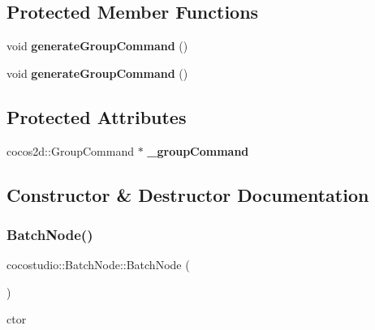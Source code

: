\subsection*{Protected Member Functions}
\begin{DoxyCompactItemize}
\item 
\mbox{\label{classcocostudio_1_1BatchNode_ae972bbb194f311b264b03f06f98d785c}} 
void {\bfseries generate\+Group\+Command} ()
\item 
\mbox{\label{classcocostudio_1_1BatchNode_ae972bbb194f311b264b03f06f98d785c}} 
void {\bfseries generate\+Group\+Command} ()
\end{DoxyCompactItemize}
\subsection*{Protected Attributes}
\begin{DoxyCompactItemize}
\item 
\mbox{\label{classcocostudio_1_1BatchNode_a6816ed72be97ec09cb1a1032b29d4aea}} 
cocos2d\+::\+Group\+Command $\ast$ {\bfseries \+\_\+group\+Command}
\end{DoxyCompactItemize}


\subsection{Constructor \& Destructor Documentation}
\mbox{\label{classcocostudio_1_1BatchNode_a48ed84f76151e015d6d4487974a24cd8}} 
\subsubsection{\texorpdfstring{Batch\+Node()}{BatchNode()}\hspace{0.1cm}{\footnotesize\ttfamily [1/2]}}
{\footnotesize\ttfamily cocostudio\+::\+Batch\+Node\+::\+Batch\+Node (\begin{DoxyParamCaption}{ }\end{DoxyParamCaption})}

ctor \mbox{\label{classcocostudio_1_1BatchNode_a33caa2c2bb460a99e0f9151866b533de}} 

